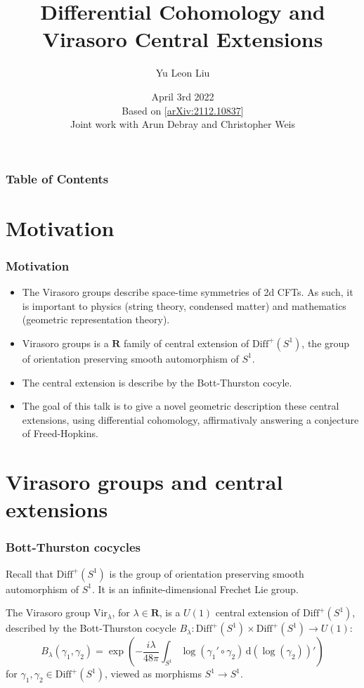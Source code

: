 \documentclass{beamer}
\title{Differential Cohomology and Virasoro Central Extensions}
\author[Yu Leon Liu ]{Yu Leon Liu} %
\institute[Rouen University]{\textbf {Rouen University}}\institute{Harvard University}
\date[April 2rd 2022] {April 3rd 2022 \\ \vspace{5mm} Based on [\href{https://arxiv.org/abs/2112.10837}{arXiv:2112.10837}] \\ Joint work 
with Arun Debray and Christopher Weis}
\newcommand{\mb}{\mathbf}
\newcommand{\Diff}{\mathrm{Diff}^+(S^1)}
\renewcommand{\d}{\mathrm d}
\newcommand{\ud}{\,\d}
\newcommand{\Vir}{\mathrm{Vir}}
\begin{document}
\frame{\titlepage}

\begin{frame}
    \frametitle{Table of Contents}
    \tableofcontents
    \end{frame}


\section{Motivation}
\begin{frame}
\frametitle{Motivation}
\begin{itemize}
    \item <1 -> The \alert{Virasoro groups} describe space-time symmetries 
    of 2d CFTs. As such, it is important to physics (string theory, condensed matter) and 
    mathematics (geometric representation theory).
    \item <2 -> \alert{Virasoro groups} is a $\mb{R}$ family of central extension of $\Diff$, the group of 
    orientation preserving smooth automorphism of $S^1$. 
    \item <3 -> The central extension is describe by the 
    \alert{Bott-Thurston cocyle}. 
    \item <4 -> The goal of this talk is to give a novel geometric description 
    these central extensions, using differential cohomology, affirmativaly answering a conjecture of Freed-Hopkins.
\end{itemize}

\end{frame}

\section{Virasoro groups and central extensions}

\begin{frame}
    \frametitle{Bott-Thurston cocycles}

Recall that $\Diff$ is the group of orientation preserving smooth automorphism of $S^1$. 
It is an infinite-dimensional Frechet Lie group. \pause
    \begin{definition}
The Virasoro group $\Vir_\lambda$, for $\lambda \in \mb{R}$, is a $U(1)$ central extension of $\Diff$, described by the \alert{Bott-Thurston cocycle}
$B_\lambda: \Diff \times \Diff \to U(1)$: \pause
\begin{equation}
    B_\lambda(\gamma_1, \gamma_2) = \exp\left(-\frac{i\lambda}{48\pi}\int_{S^1} \log(\gamma_1'
        \circ\gamma_2) \ud(\log(\gamma_2))'\right)
\end{equation}
for $\gamma_1, \gamma_2 \in \Diff$, viewed as morphisms $S^1 \to S^1$.
\end{definition}
\end{frame}
\end{document}
